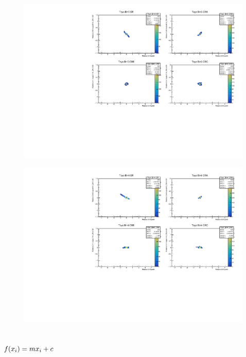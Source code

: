\begin{figure}[H]
\includegraphics[width=\textwidth]{plots/diffx/instab/constfx/instabilities_mjj_QCD_Sh2211_Signal_Sh2211_BSMCQCDSTATS_sherpaasimov_bin3.pdf}
\end{figure}
\begin{figure}[H]
\includegraphics[width=\textwidth]{plots/diffx/instab/constfx/instabilities_mjj_QCD_Sh2211_Signal_Sh2211_BSMCQCDSTATS_sherpaasimov_bin4.pdf}
\end{figure}

\subsection{$f(x_i)=mx_i+c$\label{sec:appendix:stability:fxlinear}}
